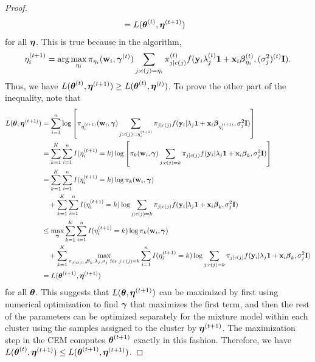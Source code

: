\begin{proof}
\begin{align*}
  &= L(\boldsymbol\theta^{(t)},\boldsymbol\eta^{(t+1)})
    \end{align*}
for all $\boldsymbol\eta$. This is true because in the algorithm, $$\eta^{(t+1)}_{i} = \arg \max_{\eta_{i}} \pi_{\eta_{i}}(\mathbf w_{i},\boldsymbol \gamma^{(t)})\sum_{j:c(j)=\eta_{i}}\pi_{j|c(j)}^{(t)}f(\mathbf y_{i}\lambda_{j}^{(t)}\mathbf 1+\mathbf x_{i}\boldsymbol\beta^{(t)}_{\eta_{i}},(\sigma^{2}_{j})^{(t)}\mathbf I).$$
   Thus, we have $    L(\boldsymbol\theta^{(t)},\boldsymbol\eta^{(t+1)})\geq L(\boldsymbol\theta^{(t)},\boldsymbol\eta^{(t)})$. To prove the other part of the inequality, note that
       \begin{align*}
 L(\boldsymbol\theta,\boldsymbol\eta^{(t+1)})  &= \sum^{n}_{i=1}\log\left[\pi_{\eta^{(t+1)}_{i}}(\mathbf w_{i},\boldsymbol \gamma)\sum_{j:c(j)=\eta^{(t+1)}_{i}}\pi_{j|c(j)}f(\mathbf y_{i}|\lambda_{j}\mathbf 1+\mathbf x_{i}\boldsymbol\beta_{\eta^{(t+1)}_{i}},\sigma_{j}^{2}\mathbf I)\right]\\
 &= \sum^{K}_{k=1}\sum^{n}_{i=1}I(\eta^{(t+1)}_{i} = k)\log\left[\pi_{k}(\mathbf w_{i},\boldsymbol \gamma)\sum_{j:c(j)=k}\pi_{j|c(j)}f(\mathbf y_{i}|\lambda_{j}\mathbf 1+\mathbf x_{i}\boldsymbol\beta_{k},\sigma_{j}^{2}\mathbf I)\right]\\
  &= \sum^{K}_{k=1}\sum^{n}_{i=1}I(\eta^{(t+1)}_{i} = k)\log\pi_{k}(\mathbf w_{i},\boldsymbol \gamma)\\
  &\quad+\sum^{K}_{k=1}\sum^{n}_{i=1}I(\eta^{(t+1)}_{i} = k)\log \sum_{j:c(j)=k}\pi_{j|c(j)}f(\mathbf y_{i}|\lambda_{j}\mathbf 1+\mathbf x_{i}\boldsymbol\beta_{k},\sigma_{j}^{2}\mathbf I)\\
    &\leq\max_{\boldsymbol\gamma} \sum^{K}_{k=1}\sum^{n}_{i=1}I(\eta^{(t+1)}_{i} = k)\log\pi_{k}(\mathbf w_{i},\boldsymbol \gamma)\\
  &\quad+\sum^{K}_{k=1}\max_{\pi_{j|c(j)},\boldsymbol\beta_{k},\lambda_{j},\sigma_{j}\text{ for }j:c(j)=k}\sum^{n}_{i=1}I(\eta^{(t+1)}_{i} = k)\log \sum_{j:c(j)=k}\pi_{j|c(j)}f(\mathbf y_{i}|\lambda_{j}\mathbf 1+\mathbf x_{i}\boldsymbol\beta_{k},\sigma^{2}_{j}\mathbf I)\\
  & = L(\boldsymbol\theta^{(t+1)},\boldsymbol\eta^{(t+1)})
    \end{align*}
    for all $\boldsymbol\theta$. This suggests that $L(\boldsymbol\theta,\boldsymbol\eta^{(t+1)})$ can be maximized by first using numerical optimization to find $\boldsymbol\gamma$ that maximizes the first term, and then the rest of the parameters can be optimized separately for the mixture model within each cluster using the samples assigned to the cluster by $\boldsymbol\eta^{(t+1)}$. The maximization step in the CEM computes $\boldsymbol\theta^{(t+1)}$ exactly in this fashion. Therefore, we have $L(\boldsymbol\theta^{(t)},\boldsymbol\eta^{(t+1)})\leq L(\boldsymbol\theta^{(t+1)},\boldsymbol\eta^{(t+1)})$. 
    \end{proof}